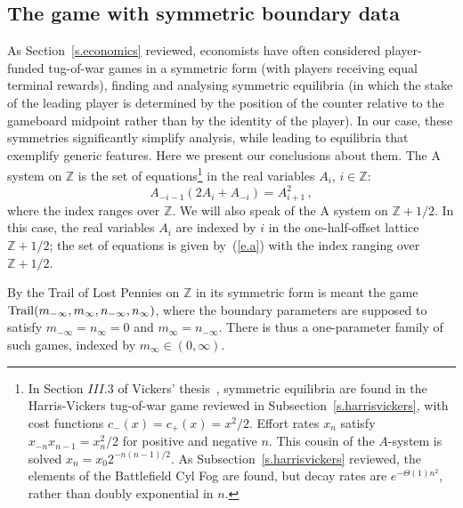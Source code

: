 \documentclass[letterpaper,11pt,oneside,reqno]{amsbook}
\newcommand{\Z}{\ensuremath{\mathbb{Z}}}
\numberwithin{figure}{chapter}
\theoremstyle{definition}
\theoremstyle{definition}
\theoremstyle{definition}
\theoremstyle{definition}
\theoremstyle{definition}
\newcommand{\game}{{\rm Trail}}
\newcommand{\amacspace}{\textrm{A} }
\begin{document}
\subsection{The game with symmetric boundary data}
As Section~\ref{s.economics} reviewed, economists have often considered  player-funded tug-of-war games in a symmetric form (with players receiving equal terminal rewards), finding and analysing symmetric equilibria (in which the stake of the leading player is determined by the position of the counter relative to the gameboard midpoint rather than by the identity of the player). 
In our case, these symmetries significantly simplify analysis, while leading to equilibria that exemplify generic features. Here we present our conclusions about them. 
The  \amacspace system on $\Z$ is the set of equations\footnote{In Section $III.3$ of Vickers' thesis~\cite{Vickers85}, symmetric equilibria are found in the Harris-Vickers tug-of-war game reviewed in Subsection~\ref{s.harrisvickers}, with cost functions $c_-(x) = c_+(x) = x^2/2$.  Effort rates $x_n$ satisfy $x_{-n} x_{n-1} = x_n^2/2$ for positive and negative $n$. This cousin of the $A$-system is solved  $x_n = x_0 2^{-n(n-1)/2}$. As Subsection~\ref{s.harrisvickers} reviewed, the elements of the Battlefield Cyl Fog are found, but decay rates are $e^{-\Theta(1) n^2}$, rather than doubly exponential in $n$.} in the real variables $A_i$, $i \in \Z$:
\begin{equation}\label{e.a}
 A_{-i-1} (2 A_i + A_{-i}) = A_{i+1}^2 \, ,
\end{equation}
where the index ranges over $\Z$.
We will also speak of the  \amacspace system on $\Z + 1/2$. In this case, the  real variables $A_i$ are indexed by $i$ in the one-half-offset lattice $\Z + 1/2$; the set of equations is given by~(\ref{e.a})
with the index ranging over $\Z + 1/2$.

By the Trail of Lost Pennies on $\Z$ in its symmetric form is meant the game  $\game(m_{-\infty},m_\infty,n_{-\infty},n_\infty)$, where the boundary parameters are supposed to satisfy $m_{-\infty} = n_\infty = 0$ and $m_\infty = n_{-\infty}$. There is thus a one-parameter family of such games, indexed by  $m_\infty \in (0,\infty)$.
\end{document}
